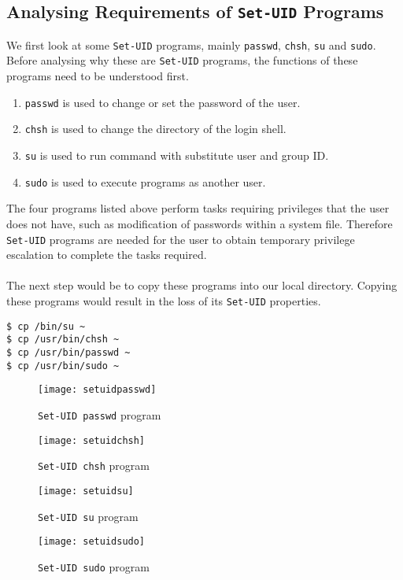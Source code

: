 \documentclass[a4paper,12pt]{article}
\begin{document}
\subsection{Analysing Requirements of \texttt{Set-UID} Programs}
We first look at some \texttt{Set-UID} programs, mainly \texttt{passwd}, \texttt{chsh}, \texttt{su} and \texttt{sudo}. Before analysing why these are \texttt{Set-UID} programs, the functions of these programs need to be understood first.
\begin{enumerate}
	\item \texttt{passwd} is used to change or set the password of the user.
	\item \texttt{chsh} is used to change the directory of the login shell.
	\item \texttt{su} is used to run command with substitute user and group ID.
	\item \texttt{sudo} is used to execute programs as another user.
\end{enumerate}
The four programs listed above perform tasks requiring privileges that the user does not have, such as modification of passwords within a system file. Therefore \texttt{Set-UID} programs are needed for the user to obtain temporary privilege escalation to complete the tasks required.\\\\The next step would be to copy these programs into our local directory. Copying these programs would result in the loss of its \texttt{Set-UID} properties. 
\begin{verbatim}
$ cp /bin/su ~
$ cp /usr/bin/chsh ~
$ cp /usr/bin/passwd ~
$ cp /usr/bin/sudo ~
\end{verbatim}
\begin{figure}[!h]
	\centering
	\begin{minipage}{0.5\linewidth}
		\centering
		\texttt{[image: setuidpasswd]}
		\caption{\texttt{Set-UID passwd} program}
		\label{fig:setuidpasswd}
	\end{minipage}%
	\begin{minipage}{0.5\linewidth}
		\centering
		\texttt{[image: setuidchsh]}
		\caption{\texttt{Set-UID chsh} program}
		\label{fig:setuidchsh}
	\end{minipage}
\end{figure}
\begin{figure}[!h]
	\centering
	\begin{minipage}{0.5\linewidth}
		\centering
		\texttt{[image: setuidsu]}
		\caption{\texttt{Set-UID su} program}
		\label{fig:setuidsu}
	\end{minipage}%
	\begin{minipage}{0.5\linewidth}
		\centering
		\texttt{[image: setuidsudo]}
		\caption{\texttt{Set-UID sudo} program}
		\label{fig:setuidsudo}
	\end{minipage}
\end{figure}
\end{document}
